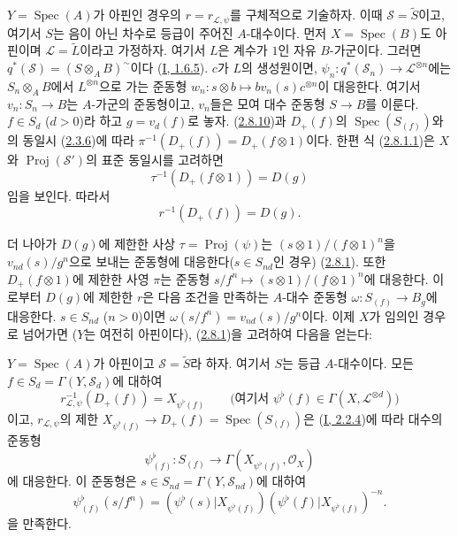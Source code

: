 \begin{env}[3.7.2]
\label{II.3.7.2-ko}
$Y=\operatorname{Spec}(A)$가 아핀인 경우의
$r=r_{\mathcal{L},\psi}$를 구체적으로 기술하자. 이때
$\mathcal{S}=\widetilde{S}$이고, 여기서 $S$는 음이 아닌 차수로 등급이
주어진 $A$-대수이다. 먼저 $X=\operatorname{Spec}(B)$도 아핀이며
$\mathcal{L}=\widetilde{L}$이라고 가정하자. 여기서 $L$은 계수가 $1$인
자유 $B$-가군이다. 그러면
$q^*(\mathcal{S})=(S\otimes_AB)^{\sim}$이다
(\hyperref[I.1.6.5-ko]{I, 1.6.5}). $c$가 $L$의 생성원이면,
$\psi_n:q^*(\mathcal{S}_n)\to\mathcal{L}^{\otimes n}$에는
$S_n\otimes_AB$에서 $L^{\otimes n}$으로 가는 준동형
$w_n:s\otimes b\mapsto bv_n(s)c^{\otimes n}$이 대응한다. 여기서
$v_n:S_n\to B$는 $A$-가군의 준동형이고, $v_n$들은 모여 대수 준동형
$S\to B$를 이룬다. $f\in S_d$ ($d>0$)라 하고 $g=v_d(f)$로 놓자.
(\hyperref[II.2.8.10-ko]{2.8.10})과 $D_+(f)$의
$\operatorname{Spec}(S_{(f)})$와의 동일시
(\hyperref[II.2.3.6-ko]{2.3.6})에 따라
$\pi^{-1}(D_+(f))=D_+(f\otimes1)$이다. 한편 식
(\hyperref[II.2.8.1.1-ko]{2.8.1.1})은 $X$와
$\operatorname{Proj}(\mathcal{S}')$의 표준 동일시를 고려하면
\[
  \tau^{-1}(D_+(f\otimes1))=D(g)
\]
임을 보인다. 따라서
\[
\label{II.3.7.2.1-ko}
  r^{-1}(D_+(f))=D(g).
\tag{3.7.2.1}
\]

더 나아가 $D(g)$에 제한한 사상 $\tau=\operatorname{Proj}(\psi)$는
$(s\otimes1)/(f\otimes1)^n$을 $v_{nd}(s)/g^n$으로 보내는 준동형에
대응한다($s\in S_{nd}$인 경우)
(\hyperref[II.2.8.1-ko]{2.8.1}). 또한 $D_+(f\otimes1)$에 제한한 사영
$\pi$는 준동형
$s/f^n\mapsto(s\otimes1)/(f\otimes1)^n$에 대응한다. 이로부터
$D(g)$에 제한한 $r$은 다음 조건을 만족하는 $A$-대수 준동형
$\omega:S_{(f)}\to B_g$에 대응한다.
$s\in S_{nd}$ ($n>0$)이면
$\omega(s/f^n)=v_{nd}(s)/g^n$이다. 이제 $X$가 임의인 경우로 넘어가면
($Y$는 여전히 아핀이다), (\hyperref[II.2.8.1-ko]{2.8.1})을 고려하여
다음을 얻는다:
\end{env}

\begin{proposition}[3.7.3]
\label{II.3.7.3-ko}
$Y=\operatorname{Spec}(A)$가 아핀이고 $\mathcal{S}=\widetilde{S}$라 하자.
여기서 $S$는 등급 $A$-대수이다. 모든
$f\in S_d=\Gamma(Y,\mathcal{S}_d)$에 대하여
\[
\label{II.3.7.3.1-ko}
  r_{\mathcal{L},\psi}^{-1}(D_+(f))=X_{\psi^\flat(f)}
  \qquad\bigl(\text{여기서 }\psi^\flat(f)\in
  \Gamma(X,\mathcal{L}^{\otimes d})\bigr)
\tag{3.7.3.1}
\]
이고, $r_{\mathcal{L},\psi}$의 제한
$X_{\psi^\flat(f)}\to D_+(f)=\operatorname{Spec}(S_{(f)})$은
(\hyperref[I.2.2.4-ko]{I, 2.2.4})에 따라 대수의 준동형
\[
\label{II.3.7.3.2-ko}
  \psi_{(f)}^\flat:S_{(f)}\longrightarrow
  \Gamma(X_{\psi^\flat(f)},\mathcal{O}_X)
\tag{3.7.3.2}
\]
에 대응한다. 이 준동형은
$s\in S_{nd}=\Gamma(Y,\mathcal{S}_{nd})$에 대하여
\[
\label{II.3.7.3.3-ko}
  \psi_{(f)}^\flat(s/f^n)
  =(\psi^\flat(s)|X_{\psi^\flat(f)})
   (\psi^\flat(f)|X_{\psi^\flat(f)})^{-n}.
\tag{3.7.3.3}
\]
을 만족한다.
\end{proposition}

